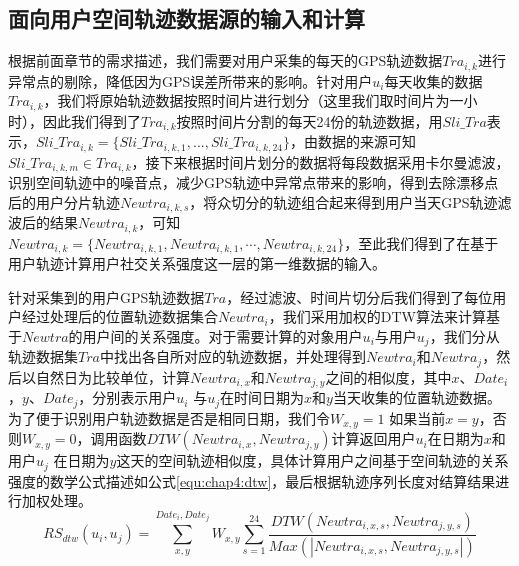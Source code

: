 \subsection{面向用户空间轨迹数据源的输入和计算}
根据前面章节的需求描述，我们需要对用户采集的每天的GPS轨迹数据$Tra_{i,k}$进行异常点的剔除，降低因为GPS误差所带来的影响。针对用户$u_{i}$每天收集的数据$Tra_{i,k}$，我们将原始轨迹数据按照时间片进行划分（这里我们取时间片为一小时），因此我们得到了$Tra_{i,k}$按照时间片分割的每天24份的轨迹数据，用$Sli\_Tra$表示，$Sli\_Tra_{i,k}=\{Sli\_Tra_{i,k,1},...,Sli\_Tra_{i,k,24}\}$，由数据的来源可知$Sli\_Tra_{i,k,m} \in Tra_{i,k}$，接下来根据时间片划分的数据将每段数据采用卡尔曼滤波，识别空间轨迹中的噪音点，减少GPS轨迹中异常点带来的影响，得到去除漂移点后的用户分片轨迹$Newtra_{i,k,s}$，将众切分的轨迹组合起来得到用户当天GPS轨迹滤波后的结果$Newtra_{i,k}$，可知$Newtra_{i,k}=\{ Newtra_{i,k,1},Newtra_{i,k,1}, \cdots,Newtra_{i,k,24}\}$，至此我们得到了在基于用户轨迹计算用户社交关系强度这一层的第一维数据的输入。
\par 针对采集到的用户GPS轨迹数据$Tra$，经过滤波、时间片切分后我们得到了每位用户经过处理后的位置轨迹数据集合$Newtra_{i}$，我们采用加权的DTW算法来计算基于$Newtra$的用户间的关系强度。对于需要计算的对象用户$u_{i}$与用户$u_{j}$，我们分从轨迹数据集$Tra$中找出各自所对应的轨迹数据，并处理得到$Newtra_{i}$和$Newtra_{j}$，然后以自然日为比较单位，计算$Newtra_{i,x}$和$Newtra_{j,y}$之间的相似度，其中$x 、 Date_{i}$，$y 、 Date_{j}$，分别表示用户$u_{i}$ 与$u_{j}$在时间日期为$x$和$y$当天收集的位置轨迹数据。为了便于识别用户轨迹数据是否是相同日期，我们令$W_{x,y}=1$ 如果当前$x=y$，否则$W_{x,y}=0$，调用函数$DTW(Newtra_{i,x},Newtra_{j,y})$计算返回用户$u_{i}$在日期为$x$和用户$u_{j}$ 在日期为$y$这天的空间轨迹相似度，具体计算用户之间基于空间轨迹的关系强度的数学公式描述如公式\ref{equ:chap4:dtw}，最后根据轨迹序列长度对结算结果进行加权处理。
\begin{equation}
\label{equ:chap4:dtw}
RS_{dtw}(u_{i},u_{j})=\sum_{x ,y }^{ Date_{i}, Date_{j}}W_{x,y}\sum_{s=1}^{24} \frac{DTW(Newtra_{i,x,s},Newtra_{j,y,s})}{Max(\left | Newtra_{i,x,s},Newtra_{j,y,s}  \right |)}
\end{equation}
